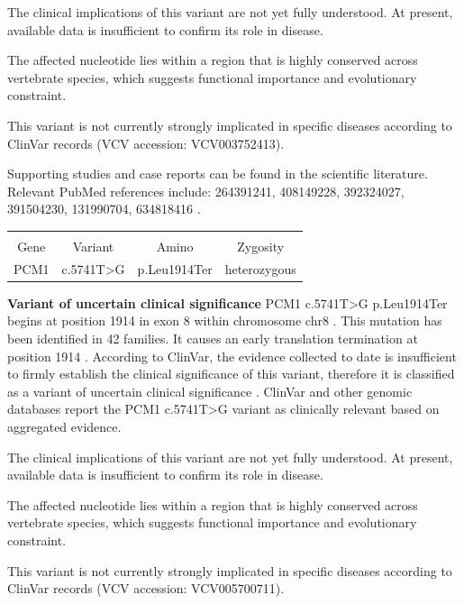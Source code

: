 \documentclass[11pt]{extarticle}
\begin{document}
 The clinical implications of this variant are not yet fully 
        understood. At present, available data is insufficient 
        to confirm its role in disease. 

The affected nucleotide lies within a region 
  that is highly conserved across vertebrate species, which suggests functional importance and evolutionary constraint. 


      This variant is not currently strongly implicated in specific diseases according to ClinVar records  (VCV accession: VCV003752413). 

Supporting studies and case reports can be found 
  in the scientific literature. Relevant PubMed references include: 264391241, 408149228, 392324027, 391504230, 131990704, 634818416 . \newpage

\vspace{2em}{\bf \large Variant 2 of 2 }
      \newline \vspace{2em} \begin{tabularx}{\textwidth}{C C C C} 
 &&&\\ Gene & Variant & Amino & Zygosity\\ PCM1  &  c.5741T>G & p.Leu1914Ter  &  heterozygous 
\end{tabularx} \vspace{2em} {\bf Variant of uncertain clinical significance } \newline
PCM1 c.5741T>G p.Leu1914Ter begins at position 1914 in exon  8 within chromosome  chr8 . This mutation has been 
      identified in  42 families.  It 
causes an early translation termination at position 1914 .
According to ClinVar, the evidence collected to date is insufficient to firmly establish the clinical significance of this variant, therefore it is classified as a variant of uncertain clinical significance .
ClinVar and other genomic databases report the PCM1 c.5741T>G variant as clinically relevant based on aggregated evidence. 

 The clinical implications of this variant are not yet fully 
        understood. At present, available data is insufficient 
        to confirm its role in disease. 

The affected nucleotide lies within a region 
  that is highly conserved across vertebrate species, which suggests functional importance and evolutionary constraint. 


      This variant is not currently strongly implicated in specific diseases according to ClinVar records  (VCV accession: VCV005700711). 
\end{document}
